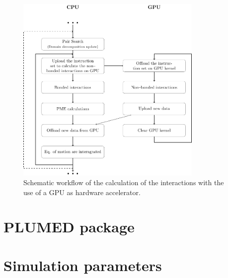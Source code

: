 \begin{figure}[h!t]
	\centering
	\includegraphics[width=0.8\textwidth]{./img/Schemi/GPU}
	\caption{Schematic workflow of the calculation of the interactions with the use of a GPU as hardware accelerator.}
	\label{fig:GPU}
\end{figure}



\section{PLUMED package}

\section{Simulation parameters}


